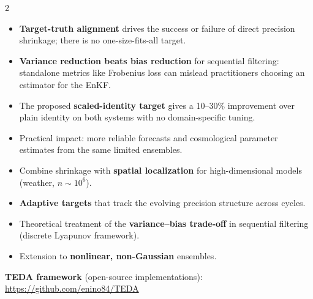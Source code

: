 \documentclass[11pt]{article}
\begin{document}
\begin{multicols}{2}
\begin{tcolorbox}[posterbox=Conclusions]
\small
\begin{itemize}
\item \textbf{Target-truth alignment} drives the success or failure of
      direct precision shrinkage; there is no one-size-fits-all target.
\item \textbf{Variance reduction beats bias reduction} for sequential
      filtering: standalone metrics like Frobenius loss can mislead
      practitioners choosing an estimator for the EnKF.
\item The proposed \textbf{scaled-identity target} gives a 10--30\%
      improvement over plain identity on both systems with no
      domain-specific tuning.
\item Practical impact: more reliable forecasts and cosmological
      parameter estimates from the same limited ensembles.
\end{itemize}
\end{tcolorbox}

\begin{tcolorbox}[posterbox=Future Work]
\small
\begin{itemize}
\item Combine shrinkage with \textbf{spatial localization} for
      high-dimensional models (weather, $n{\sim}10^6$).
\item \textbf{Adaptive targets} that track the evolving precision
      structure across cycles.
\item Theoretical treatment of the \textbf{variance--bias trade-off} in
      sequential filtering (discrete Lyapunov framework).
\item Extension to \textbf{nonlinear, non-Gaussian} ensembles.
\end{itemize}
\end{tcolorbox}

\begin{tcolorbox}[posterbox=Code]
\footnotesize
\textbf{TEDA framework} (open-source implementations):\\
\url{https://github.com/enino84/TEDA}
\end{tcolorbox}

\end{multicols}
\end{document}
